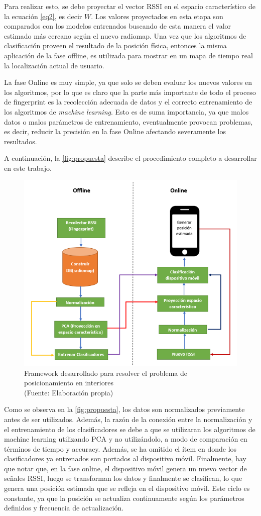 Para realizar esto, se debe proyectar el vector RSSI en el espacio característico de la ecuación \ref{eq2}, es decir $W$. Los valores proyectados en esta etapa son comparados con los modelos entrenados buscando de esta manera el valor estimado más cercano según el nuevo radiomap. Una vez que los algoritmos de clasificación proveen el resultado de la posición física, entonces la misma aplicación de la fase offline, es utilizada para mostrar en un mapa de tiempo real la localización actual de usuario.

La fase Online es muy simple, ya que solo se deben evaluar los nuevos valores en los algoritmos, por lo que es claro que la parte más importante de todo el proceso de fingerprint es la recolección adecuada de datos y el correcto entrenamiento de los algoritmos de \textit{machine learning}. Esto es de suma importancia, ya que malos datos o malos parámetros de entrenamiento, eventualmente provocan problemas, es decir, reducir la precisión en la fase Online afectando severamente los resultados.

A continuación, la \autoref{fig:propuesta} describe el procedimiento completo a desarrollar en este trabajo.


\begin{figure}[ht!]
\centering
\includegraphics[width=.6\textwidth]{figures/propuesta_memoria.png}
\caption[Framework desarrollado para posicionamiento indoor]{Framework desarrollado para resolver el problema de posicionamiento en interiores\\
{\scriptsize (Fuente: Elaboración propia)}}
\label{fig:propuesta}
\end{figure}

Como se observa en la \autoref{fig:propuesta}, los datos son normalizados previamente antes de ser utilizados. Además, la razón de la conexión entre la normalización y el entrenamiento de los clasificadores se debe a que se utilizaran los algoritmos de machine learning utilizando PCA y no utilizándolo, a modo de comparación en términos de tiempo y accuracy. Además, se ha omitido el ítem en donde los clasificadores ya entrenados son portados al dispositivo móvil. Finalmente, hay que notar que, en la fase online, el dispositivo móvil genera un nuevo vector de señales RSSI, luego se transforman los datos y finalmente se clasifican, lo que genera una posición estimada que se refleja en el dispositivo móvil. Este ciclo es constante, ya que la posición se actualiza continuamente según los parámetros definidos y frecuencia de actualización.
